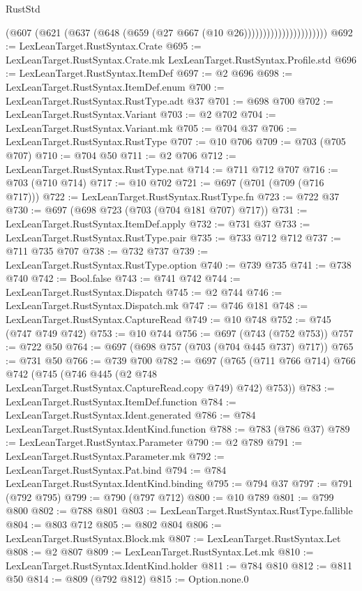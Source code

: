 \begin{lexlean}{RustStd}
\begin{coremodule}
                                  (@607
                                    (@621 (@637 (@648 (@659 (@27 @667 (@10 @26))))))))))))))))))))))
@692 := LexLeanTarget.RustSyntax.Crate
@695 := LexLeanTarget.RustSyntax.Crate.mk LexLeanTarget.RustSyntax.Profile.std
@696 := LexLeanTarget.RustSyntax.ItemDef
@697 := @2 @696
@698 := LexLeanTarget.RustSyntax.ItemDef.enum
@700 := LexLeanTarget.RustSyntax.RustType.adt @37
@701 := @698 @700
@702 := LexLeanTarget.RustSyntax.Variant
@703 := @2 @702
@704 := LexLeanTarget.RustSyntax.Variant.mk
@705 := @704 @37
@706 := LexLeanTarget.RustSyntax.RustType
@707 := @10 @706
@709 := @703 (@705 @707)
@710 := @704 @50
@711 := @2 @706
@712 := LexLeanTarget.RustSyntax.RustType.nat
@714 := @711 @712 @707
@716 := @703 (@710 @714)
@717 := @10 @702
@721 := @697 (@701 (@709 (@716 @717)))
@722 := LexLeanTarget.RustSyntax.RustType.fn
@723 := @722 @37
@730 := @697 (@698 @723 (@703 (@704 @181 @707) @717))
@731 := LexLeanTarget.RustSyntax.ItemDef.apply
@732 := @731 @37
@733 := LexLeanTarget.RustSyntax.RustType.pair
@735 := @733 @712 @712
@737 := @711 @735 @707
@738 := @732 @737
@739 := LexLeanTarget.RustSyntax.RustType.option
@740 := @739 @735
@741 := @738 @740
@742 := Bool.false
@743 := @741 @742
@744 := LexLeanTarget.RustSyntax.Dispatch
@745 := @2 @744
@746 := LexLeanTarget.RustSyntax.Dispatch.mk
@747 := @746 @181
@748 := LexLeanTarget.RustSyntax.CaptureRead
@749 := @10 @748
@752 := @745 (@747 @749 @742)
@753 := @10 @744
@756 := @697 (@743 (@752 @753))
@757 := @722 @50
@764 := @697 (@698 @757 (@703 (@704 @445 @737) @717))
@765 := @731 @50
@766 := @739 @700
@782 := @697
    (@765
      (@711 @766 @714)
      @766
      @742
      (@745 (@746 @445 (@2 @748 LexLeanTarget.RustSyntax.CaptureRead.copy @749) @742) @753))
@783 := LexLeanTarget.RustSyntax.ItemDef.function
@784 := LexLeanTarget.RustSyntax.Ident.generated
@786 := @784 LexLeanTarget.RustSyntax.IdentKind.function
@788 := @783 (@786 @37)
@789 := LexLeanTarget.RustSyntax.Parameter
@790 := @2 @789
@791 := LexLeanTarget.RustSyntax.Parameter.mk
@792 := LexLeanTarget.RustSyntax.Pat.bind
@794 := @784 LexLeanTarget.RustSyntax.IdentKind.binding
@795 := @794 @37
@797 := @791 (@792 @795)
@799 := @790 (@797 @712)
@800 := @10 @789
@801 := @799 @800
@802 := @788 @801
@803 := LexLeanTarget.RustSyntax.RustType.fallible
@804 := @803 @712
@805 := @802 @804
@806 := LexLeanTarget.RustSyntax.Block.mk
@807 := LexLeanTarget.RustSyntax.Let
@808 := @2 @807
@809 := LexLeanTarget.RustSyntax.Let.mk
@810 := LexLeanTarget.RustSyntax.IdentKind.holder
@811 := @784 @810
@812 := @811 @50
@814 := @809 (@792 @812)
@815 := Option.none.{0}

\end{coremodule}
\end{lexlean}
